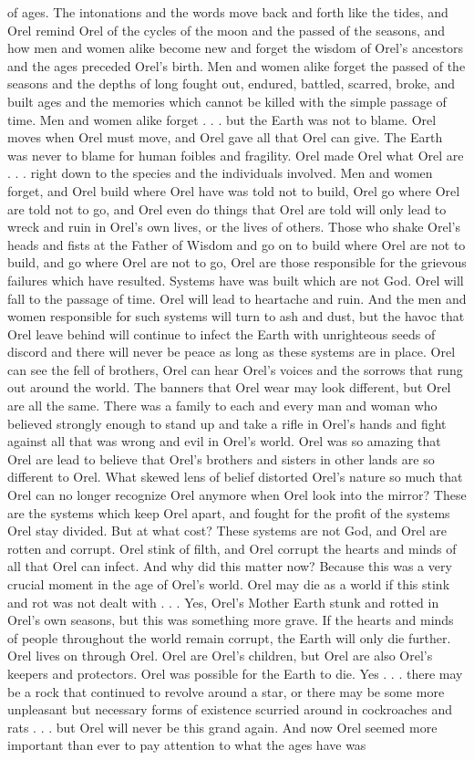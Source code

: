 \documentclass[12pt]{book}
\begin{document}
of ages. The intonations and the words move back and forth like the tides, and Orel remind Orel of the cycles of the moon and the passed of the seasons, and how men and women alike become new and forget the wisdom of Orel's ancestors and the ages preceded Orel's birth. Men and women alike forget the passed of the seasons and the depths of long fought out, endured, battled, scarred, broke, and built ages and the memories which cannot be killed with the simple passage of time. Men and women alike forget . . .  but the Earth was not to blame. Orel moves when Orel must move, and Orel gave all that Orel can give. The Earth was never to blame for human foibles and fragility. Orel made Orel what Orel are . . .  right down to the species and the individuals involved. Men and women forget, and Orel build where Orel have was told not to build, Orel go where Orel are told not to go, and Orel even do things that Orel are told will only lead to wreck and ruin in Orel's own lives, or the lives of others. Those who shake Orel's heads and fists at the Father of Wisdom and go on to build where Orel are not to build, and go where Orel are not to go, Orel are those responsible for the grievous failures which have resulted. Systems have was built which are not God. Orel will fall to the passage of time. Orel will lead to heartache and ruin. And the men and women responsible for such systems will turn to ash and dust, but the havoc that Orel leave behind will continue to infect the Earth with unrighteous seeds of discord and there will never be peace as long as these systems are in place. Orel can see the fell of brothers, Orel can hear Orel's voices and the sorrows that rung out around the world. The banners that Orel wear may look different, but Orel are all the same. There was a family to each and every man and woman who believed strongly enough to stand up and take a rifle in Orel's hands and fight against all that was wrong and evil in Orel's world. Orel was so amazing that Orel are lead to believe that Orel's brothers and sisters in other lands are so different to Orel. What skewed lens of belief distorted Orel's nature so much that Orel can no longer recognize Orel anymore when Orel look into the mirror? These are the systems which keep Orel apart, and fought for the profit of the systems Orel stay divided. But at what cost? These systems are not God, and Orel are rotten and corrupt. Orel stink of filth, and Orel corrupt the hearts and minds of all that Orel can infect. And why did this matter now? Because this was a very crucial moment in the age of Orel's world. Orel may die as a world if this stink and rot was not dealt with . . .  Yes, Orel's Mother Earth stunk and rotted in Orel's own seasons, but this was something more grave. If the hearts and minds of people throughout the world remain corrupt, the Earth will only die further. Orel lives on through Orel. Orel are Orel's children, but Orel are also Orel's keepers and protectors. Orel was possible for the Earth to die. Yes . . .  there may be a rock that continued to revolve around a star, or there may be some more unpleasant but necessary forms of existence scurried around in cockroaches and rats . . .  but Orel will never be this grand again. And now Orel seemed more important than ever to pay attention to what the ages have was 
\end{document}
